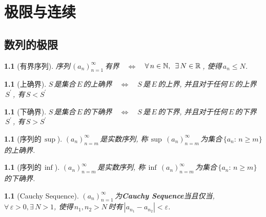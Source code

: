 \chapter{极限与连续}
\def\unseq{{\ifmmode\,(a_n)_{n=1}^\infty\,\else\(\,(a_n)_{n=1}^\infty\,\)\fi}}
\def\equalwith{{\ifmmode\quad\Longleftrightarrow\quad\else\(\quad\Longleftrightarrow\quad\)\fi}}

\section{数列的极限}

\newtheorem{bounded_sequence}[theorem_root]{}
\begin{bounded_sequence}[有界序列]
序列\(\,(a_n)_{n=1}^\infty\,\)有界\(\quad\Longleftrightarrow\quad\)\(\forall\,n\in\mathbb{N},\hskip.5em\relax\exists\,N\in \mathbb{R}\,\), 使得\(\,a_n\le N\).
\end{bounded_sequence}

\newtheorem{superior}[theorem_root]{}
\begin{superior}[上确界]
\(S\,\)是集合\(\,E\,\)的上确界\equalwith \(S\,\)是\(\,E\,\)的上界, 并且对于任何\(\,E\,\)的上界\(\,S^\prime\,\), 有\(\,S<S^\prime\)
\end{superior}

\newtheorem{inferior}[theorem_root]{}
\begin{inferior}[下确界]
\(S\,\)是集合\(\,E\,\)的下确界\equalwith \(S\,\)是\(\,E\,\)的下界, 并且对于任何\(\,E\,\)的下界\(\,S^\prime\,\), 有\(\,S>S^\prime\)
\end{inferior}

\newtheorem{superma_of_sequence}[theorem_root]{}
\newtheorem{infima_of_sequence}[theorem_root]{}
\begin{superma_of_sequence}[序列的\(\,\sup\)]
\((a_n)_{n=m}^\infty\,\)是实数序列, 称\(\,\sup\,(a_n)_{n=m}^\infty\,\)为集合\(\,\{a_n:\, n\ge m\}\)的上确界.
\end{superma_of_sequence}
\begin{infima_of_sequence}[序列的\(\,\inf\)]
\((a_n)_{n=m}^\infty\,\)是实数序列, 称\(\,\inf\,(a_n)_{n=m}^\infty\,\)为集合\(\,\{a_n:\, n\ge m\}\)的下确界.
\end{infima_of_sequence}

\newtheorem{cauchy_sequence}[theorem_root]{}
\begin{cauchy_sequence}[Cauchy Sequence]
\((a_n)_{n=1}^\infty\,\)为{\bf Cauchy Sequence}当且仅当, \(\forall\,\varepsilon>0, \exists\,N>1\), 
使得\(\,n_1, n_2>N\,\)时有\(\,|a_{n_1}-a_{n_2}|<\varepsilon\).
\end{cauchy_sequence}

